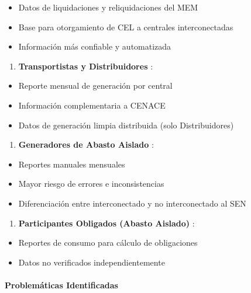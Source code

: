 \documentclass{cel}
\begin{document}
\begin{itemize}
\item Datos de liquidaciones y reliquidaciones del MEM
\item Base para otorgamiento de CEL a centrales interconectadas
\item Información más confiable y automatizada

\end{itemize}
\begin{enumerate}
\item \textbf{Transportistas y Distribuidores} :

\end{enumerate}
\begin{itemize}
\item Reporte mensual de generación por central
\item Información complementaria a CENACE
\item Datos de generación limpia distribuida (solo Distribuidores)

\end{itemize}
\begin{enumerate}
\item \textbf{Generadores de Abasto Aislado} :

\end{enumerate}
\begin{itemize}
\item Reportes manuales mensuales
\item Mayor riesgo de errores e inconsistencias
\item Diferenciación entre interconectado y no interconectado al SEN

\end{itemize}
\begin{enumerate}
\item \textbf{Participantes Obligados (Abasto Aislado)} :

\end{enumerate}
\begin{itemize}
\item Reportes de consumo para cálculo de obligaciones
\item Datos no verificados independientemente

\end{itemize}
\paragraph{Problemáticas Identificadas}
\nopagebreak
\end{document}

